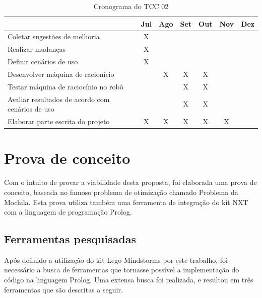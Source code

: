\FloatBarrier
\begin{table}[h]
	\centering
	
	\begin{tabular}{lcccccc}
		\toprule
		& \textbf{Jul} & \textbf{Ago} & \textbf{Set} & \textbf{Out} & \textbf{Nov} & 		
		\textbf{Dez} \\
		\midrule
		Coletar sugestões de melhoria & X &  &  &  &  &  \\
		\midrule
		Realizar mudanças & X &  &  &  &  &  \\
		\midrule
		Definir cenários de uso & X &  &  &  &  &  \\
		\midrule
		Desenvolver máquina de racionício &  & X & X & X &  &  \\
		\midrule
		Testar máquina de raciocínio no robô &  &  & X & X &  &  \\
		\midrule
		Avaliar resultados de acordo com cenários de uso &  &  & X & X &  &  \\
		\midrule
		Elaborar parte escrita do projeto & X & X & X & X & X &  \\
		\bottomrule
	\end{tabular}

	\caption{Cronograma do TCC 02}
	\label{tab02}
\end{table}

\section{Prova de conceito} \label{provaDeConceito}
Com o intuito de provar a viabilidade desta proposta, foi elaborada uma prova de conceito, baseada no famoso problema de otimização chamado Problema da Mochila. Esta prova utiliza também uma ferramenta de integração do kit NXT com a linguagem de programação Prolog.

\subsection{Ferramentas pesquisadas}
Após definido a utilização do kit Lego Mindstorms por este trabalho, foi necessário a busca de ferramentas que tornasse possível a implementação do código na linguagem Prolog. Uma extensa busca foi realizada, e resultou em três ferramentas que são descritas a seguir.

